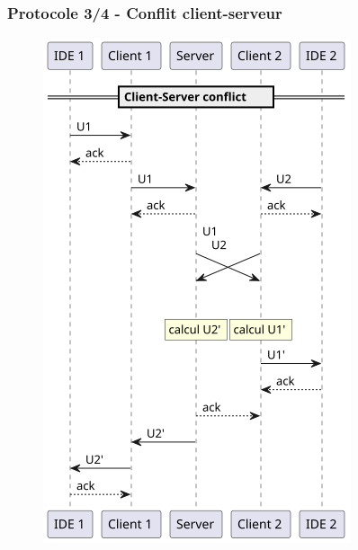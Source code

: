 \documentclass{beamer}
\begin{document}
\begin{frame}
    \frametitle{Protocole 3/4 - Conflit client-serveur}
    \begin{figure}
        \includegraphics[width=\textwidth,height=0.8\textheight,keepaspectratio]{diagrams/3.png}
    \end{figure}
\end{frame}
\end{document}
